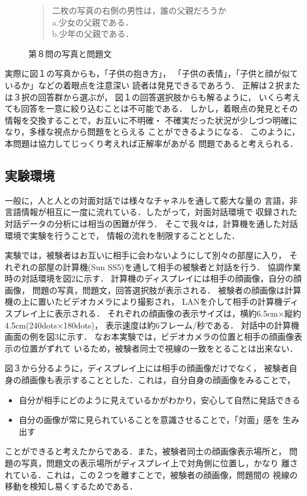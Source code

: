 \begin{figure}
\begin{quote}
\hspace{2.5cm}二枚の写真の右側の男性は，誰の父親だろうか\\
\hspace*{3.5cm}a.少女の父親である．\\
\hspace*{3.5cm}b.少年の父親である．
\end{quote}
\caption{第８問の写真と問題文\cite{Archer1980}}
\end{figure}

実際に図１の写真からも，「子供の抱き方」，
「子供の表情」，「子供と顔が似ているか」などの着眼点を注意深い
読者は発見できるであろう．
正解は２択または３択の回答群から選ぶが，
図１の回答選択肢からも解るように，
いくら考えても回答を一意に絞り込むことは不可能である．
しかし，着眼点の発見とその情報を交換することで，お互いに不明確・
不確実だった状況が少しづつ明確になり，多様な視点から問題をとらえる
ことができるようになる．
このように，本問題は協力してじっくり考えれば正解率があがる
問題であると考えられる．

\subsection{実験環境}

一般に，人と人との対面対話では様々なチャネルを通して膨大な量の
言語，非言語情報が相互に一度に流れている．したがって，対面対話環境で
収録された対話データの分析には相当の困難が伴う．
そこで我々は，計算機を通した対話環境で実験を行うことで，
情報の流れを制限することとした．

実験では，被験者はお互いに相手に会わないようにして別々の部屋に入り，
それぞれの部屋の計算機(Sun SS5)を通して相手の被験者と対話を行う．
協調作業時の対話環境を図2に示す．
計算機のディスプレイには相手の顔画像，自分の顔画像，
問題の写真，問題文，回答選択肢が表示される．
被験者の顔画像は計算機の上に置いたビデオカメラにより撮影され，
LANを介して相手の計算機ディスプレイ上に表示される．
それぞれの顔画像の表示サイズは，横約6.5cm×縦約4.5cm(240dots×180dots)，
表示速度は約6フレーム/秒である．
対話中の計算機画面の例を図3に示す．
なお本実験では，ビデオカメラの位置と相手の顔画像表示の位置がずれて
いるため，被験者同士で視線の一致をとることは出来ない．

図３から分るように，ディスプレイ上には相手の顔画像だけでなく，
被験者自身の顔画像も表示することとした．これは，自分自身の顔画像をみることで，
\begin{itemize}
\item 自分が相手にどのように見えているかがわかり，安心して自然に発話できる
\item 自分の画像が常に見られていることを意識させることで，「対面」感を
生み出す
\end{itemize}
ことができると考えたからである．また，被験者同士の顔画像表示場所と，
問題の写真，問題文の表示場所がディスプレイ上で対角側に位置し，かなり
離されている．これは，この２つを離すことで，被験者の顔画像，問題間の
視線の移動を検知し易くするためである．

